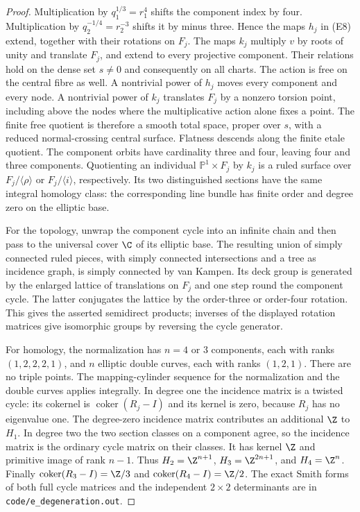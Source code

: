 \begin{proof}
Multiplication by $q_1^{1/3}=r_1^4$ shifts the component index by four.
Multiplication by $q_2^{-1/4}=r_2^{-3}$ shifts it by minus three.
Hence the maps $h_j$ in (E8) extend, together with their rotations
on $F_j$. The maps $k_j$ multiply $v$ by roots of unity and translate
$F_j$, and extend to every projective component. Their relations
hold on the dense set $s\ne0$ and consequently on all charts.
The action is free on the central fibre as well. A nontrivial power
of $h_j$ moves every component and every node. A nontrivial power
of $k_j$ translates $F_j$ by a nonzero torsion point, including
above the nodes where the multiplicative action alone fixes a point.
The finite free quotient is therefore a smooth total space, proper
over $s$, with a reduced normal-crossing central surface. Flatness
descends along the finite etale quotient. The component orbits have
cardinality three and four, leaving four and three components.
Quotienting an individual $\mathbb P^1\times F_j$ by $k_j$ is a
ruled surface over $F_j/\langle\rho\rangle$ or
$F_j/\langle i\rangle$, respectively. Its two distinguished
sections have the same integral homology class: the corresponding
line bundle has finite order and degree zero on the elliptic base.

For the topology, unwrap the component cycle into an infinite chain
and then pass to the universal cover $\C$ of its elliptic base.
The resulting union of simply connected ruled pieces, with
simply connected intersections and a tree as incidence graph, is
simply connected by van Kampen. Its deck group is generated by
the enlarged lattice of translations on $F_j$ and one step round
the component cycle. The latter conjugates the lattice by the
order-three or order-four rotation. This gives the asserted
semidirect products; inverses of the displayed rotation matrices
give isomorphic groups by reversing the cycle generator.

For homology, the normalization has $n=4$ or $3$ components, each
with ranks $(1,2,2,2,1)$, and $n$ elliptic double curves, each with
ranks $(1,2,1)$. There are no triple points. The mapping-cylinder
sequence for the normalization and the double curves applies
integrally. In degree one the incidence matrix is a twisted cycle:
its cokernel is $\operatorname{coker}(R_j-I)$ and its kernel is
zero, because $R_j$ has no eigenvalue one. The degree-zero incidence
matrix contributes an additional $\Z$ to $H_1$. In degree two the
two section classes on a component agree, so the incidence matrix
is the ordinary cycle matrix on their classes. It has kernel
$\Z$ and primitive image of rank $n-1$. Thus $H_2=\Z^{n+1}$,
$H_3=\Z^{2n+1}$, and $H_4=\Z^n$. Finally
$\operatorname{coker}(R_3-I)=\Z/3$ and
$\operatorname{coker}(R_4-I)=\Z/2$. The exact Smith forms of both
full cycle matrices and the independent $2\times2$ determinants
are in \texttt{code/e\_degeneration.out}.
\end{proof}






